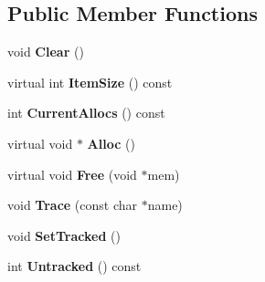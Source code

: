 \subsection*{Public Member Functions}
\begin{DoxyCompactItemize}
\item 
void {\bfseries Clear} ()\hypertarget{classtinyxml2_1_1_mem_pool_t_a469d55e82be97d5ffeff82dd001a7029}{}\label{classtinyxml2_1_1_mem_pool_t_a469d55e82be97d5ffeff82dd001a7029}

\item 
virtual int {\bfseries Item\+Size} () const \hypertarget{classtinyxml2_1_1_mem_pool_t_a7ec8778fe99f6e332615a703be0b48bc}{}\label{classtinyxml2_1_1_mem_pool_t_a7ec8778fe99f6e332615a703be0b48bc}

\item 
int {\bfseries Current\+Allocs} () const \hypertarget{classtinyxml2_1_1_mem_pool_t_a56be11b7db6a7ef00db17088a7769aab}{}\label{classtinyxml2_1_1_mem_pool_t_a56be11b7db6a7ef00db17088a7769aab}

\item 
virtual void $\ast$ {\bfseries Alloc} ()\hypertarget{classtinyxml2_1_1_mem_pool_t_aa9d785a48ffe6ea1be679bab13464486}{}\label{classtinyxml2_1_1_mem_pool_t_aa9d785a48ffe6ea1be679bab13464486}

\item 
virtual void {\bfseries Free} (void $\ast$mem)\hypertarget{classtinyxml2_1_1_mem_pool_t_a4f1a0c434e9e3d7391e5c16ed4ee8c70}{}\label{classtinyxml2_1_1_mem_pool_t_a4f1a0c434e9e3d7391e5c16ed4ee8c70}

\item 
void {\bfseries Trace} (const char $\ast$name)\hypertarget{classtinyxml2_1_1_mem_pool_t_a0bc596f271e0f139822c534238b3f244}{}\label{classtinyxml2_1_1_mem_pool_t_a0bc596f271e0f139822c534238b3f244}

\item 
void {\bfseries Set\+Tracked} ()\hypertarget{classtinyxml2_1_1_mem_pool_t_a7798932414916199a1bc0f9c3f368521}{}\label{classtinyxml2_1_1_mem_pool_t_a7798932414916199a1bc0f9c3f368521}

\item 
int {\bfseries Untracked} () const \hypertarget{classtinyxml2_1_1_mem_pool_t_a524b90d0edeac41964c06510757dce0f}{}\label{classtinyxml2_1_1_mem_pool_t_a524b90d0edeac41964c06510757dce0f}

\end{DoxyCompactItemize}
